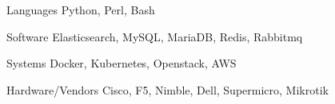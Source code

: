 
\begin{cvskills}

  \cvskill
    {Languages} %
    {Python, Perl, Bash} %

  \cvskill
    {Software} %
    {Elasticsearch, MySQL, MariaDB, Redis, Rabbitmq} %
    
  \cvskill
    {Systems} %
    {Docker, Kubernetes, Openstack, AWS} %
    
  \cvskill
    {Hardware/Vendors} %
    {Cisco, F5, Nimble, Dell, Supermicro, Mikrotik} %

\end{cvskills}

